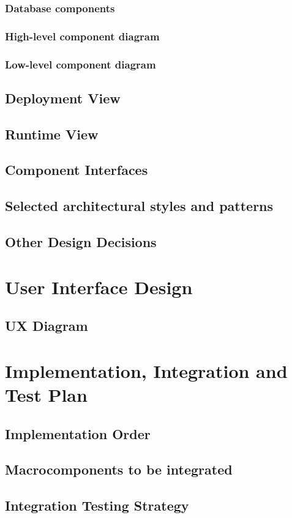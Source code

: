 \documentclass[12pt]{article}
\begin{document}
\subsubsection{Database components}\label{databasecomponent}

\subsubsection{High-level component diagram}
\subsubsection{Low-level component diagram}

\subsection{Deployment View}\label{deploymentview}

\subsection{Runtime View}\label{runtimeview}

\subsection{Component Interfaces}\label{componentinterfaces}

\subsection{Selected architectural styles and patterns}\label{archstyles}

\subsection{Other Design Decisions}\label{otherdecisions}

\clearpage
\section{User Interface Design}
\subsection{UX Diagram}

\clearpage
\section{Implementation, Integration and Test Plan}
\subsection{Implementation Order}

\subsection{Macrocomponents to be integrated}
\subsection{Integration Testing Strategy}

\end{document}
